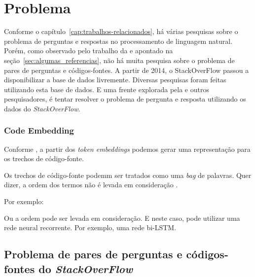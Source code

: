 \chapter{Problema}
\label{cap:problema}

Conforme o capítulo~\ref{cap:trabalhos-relacionados}, há várias pesquisas sobre o problema de perguntas e respostas no processamento de linguagem natural. Porém, como observado pelo trabalho da \cite{yao-2018} e apontado na seção~\ref{sec:algumas_referencias}, não há muita pesquisa sobre o problema de pares de perguntas e códigos-fontes. A partir de 2014, o StackOverFlow passou a disponibilizar a base de dados livremente. Diversas pesquisas foram feitas utilizando esta base de dados. E uma frente explorada pela \cite{yao-2018} e outros pesquisadores, é tentar resolver o problema de pergunta e resposta utilizando os dados do \textit{StackOverFlow}.

\subsection{Code Embedding}

Conforme \cite{cambronero-deep-learning-code-search:2019}, a partir dos \textit{token embeddings} podemos gerar uma representação para os trechos de código-fonte.

Os trechos de código-fonte podemm ser tratados como uma \textit{bag} de palavras. Quer dizer, a ordem dos termos não é levada em consideração \citep{cambronero-deep-learning-code-search:2019}.



Por exemplo:




Ou a ordem pode ser levada em consideração. E neste caso, pode utilizar uma rede neural recorrente. Por exemplo, uma rede bi-LSTM. 


\section{Problema de pares de perguntas e códigos-fontes do \textit{StackOverFlow}}

